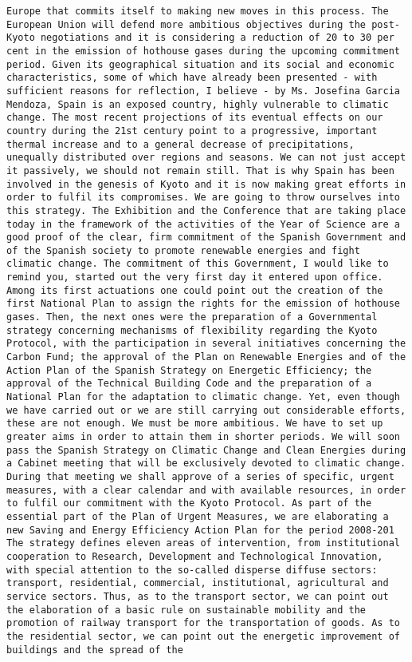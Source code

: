 \documentclass[
]{article}
\begin{document}
\begin{verbatim}
Europe that commits itself to making new moves in this process. The European Union will defend more ambitious objectives during the post-Kyoto negotiations and it is considering a reduction of 20 to 30 per cent in the emission of hothouse gases during the upcoming commitment period. Given its geographical situation and its social and economic characteristics, some of which have already been presented - with sufficient reasons for reflection, I believe - by Ms. Josefina Garcia Mendoza, Spain is an exposed country, highly vulnerable to climatic change. The most recent projections of its eventual effects on our country during the 21st century point to a progressive, important thermal increase and to a general decrease of precipitations, unequally distributed over regions and seasons. We can not just accept it passively, we should not remain still. That is why Spain has been involved in the genesis of Kyoto and it is now making great efforts in order to fulfil its compromises. We are going to throw ourselves into this strategy. The Exhibition and the Conference that are taking place today in the framework of the activities of the Year of Science are a good proof of the clear, firm commitment of the Spanish Government and of the Spanish society to promote renewable energies and fight climatic change. The commitment of this Government, I would like to remind you, started out the very first day it entered upon office. Among its first actuations one could point out the creation of the first National Plan to assign the rights for the emission of hothouse gases. Then, the next ones were the preparation of a Governmental strategy concerning mechanisms of flexibility regarding the Kyoto Protocol, with the participation in several initiatives concerning the Carbon Fund; the approval of the Plan on Renewable Energies and of the Action Plan of the Spanish Strategy on Energetic Efficiency; the approval of the Technical Building Code and the preparation of a National Plan for the adaptation to climatic change. Yet, even though we have carried out or we are still carrying out considerable efforts, these are not enough. We must be more ambitious. We have to set up greater aims in order to attain them in shorter periods. We will soon pass the Spanish Strategy on Climatic Change and Clean Energies during a Cabinet meeting that will be exclusively devoted to climatic change. During that meeting we shall approve of a series of specific, urgent measures, with a clear calendar and with available resources, in order to fulfil our commitment with the Kyoto Protocol. As part of the essential part of the Plan of Urgent Measures, we are elaborating a new Saving and Energy Efficiency Action Plan for the period 2008-201 The strategy defines eleven areas of intervention, from institutional cooperation to Research, Development and Technological Innovation, with special attention to the so-called disperse diffuse sectors: transport, residential, commercial, institutional, agricultural and service sectors. Thus, as to the transport sector, we can point out the elaboration of a basic rule on sustainable mobility and the promotion of railway transport for the transportation of goods. As to the residential sector, we can point out the energetic improvement of buildings and the spread of the 
\end{verbatim}
\end{document}
